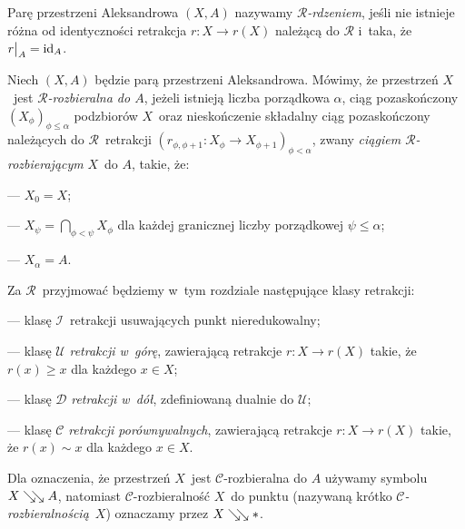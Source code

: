 Parę przestrzeni Aleksandrowa $(X,A)$ nazywamy \textit{$\mathcal{R}$-rdzeniem}, jeśli nie istnieje różna od identyczności retrakcja $r\colon X\to r(X)$ należącą do $\mathcal{R}$ i~taka, że $r\big|_A=\operatorname{id}_A$.

Niech $(X,A)$ będzie parą przestrzeni Aleksandrowa. Mówimy, że przestrzeń $X$~jest \textit{$\mathcal{R}$-rozbieralna do $A$},
 jeżeli istnieją liczba porządkowa $\alpha$, ciąg pozaskończony $(X_\phi)_{\phi\leq\alpha}$ podzbiorów $X$~oraz nieskończenie składalny ciąg  pozaskończony należących do $\mathcal{R}$~retrakcji $\left(r_{\phi,\phi+1}\colon X_\phi \to X_{\phi+1}\right)_{\phi<\alpha}$, zwany \textit{ciągiem $\mathcal{R}$-rozbierającym} $X$~do $A$, takie, że:\begin{compactitem}
\item[---] $X_0=X$;
\item[---] $X_{\psi}=\bigcap_{\phi<\psi}X_{\phi}$ dla każdej granicznej liczby porządkowej $\psi\leq\alpha$;
\item[---] $X_\alpha=A$.
\end{compactitem}

Za $\mathcal{R}$~przyjmować będziemy w~tym rozdziale następujące klasy retrakcji:
\begin{compactitem}
\item[---] klasę $\mathcal{I}$~retrakcji usuwających punkt nieredukowalny;
\item[---] klasę $\mathcal{U}$ \textit{retrakcji w~górę}, zawierającą retrakcje $r\colon X\to r(X)$ takie, że $r(x)\geq x$ dla każdego $x\in X$;
\item[---] klasę $\mathcal{D}$ \textit{retrakcji w~dół}, zdefiniowaną dualnie do $\mathcal{U}$;
\item[---] klasę $\mathcal{C}$ \textit{retrakcji porównywalnych}, zawierającą retrakcje $r\colon X\to r(X)$ takie, że $r(x)\sim x$ dla każdego $x\in X$.
\end{compactitem}
Dla oznaczenia, że przestrzeń $X$~jest $\mathcal{C}$-rozbieralna do $A$ używamy symbolu \mbox{$X\searrow\!\!\searrow A$}, natomiast $\mathcal{C}$-rozbieralność $X$~do punktu (nazywaną krótko \mbox{\textit{$\mathcal{C}$-rozbieralnością} $X$})  oznaczamy przez \mbox{$X\searrow\!\!\searrow *$}.

